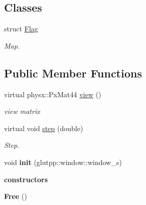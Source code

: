 \subsection*{\-Classes}
\begin{DoxyCompactItemize}
\item 
struct \hyperlink{structglutpp_1_1Camera_1_1View_1_1Free_1_1Flag}{\-Flag}
\begin{DoxyCompactList}\small\item\em \-Map. \end{DoxyCompactList}\end{DoxyCompactItemize}
\subsection*{\-Public \-Member \-Functions}
\begin{DoxyCompactItemize}
\item 
\hypertarget{classglutpp_1_1Camera_1_1View_1_1Free_a5f1648d4c0ad2289dd9e78f0b68b8a6c}{virtual physx\-::\-Px\-Mat44 \hyperlink{classglutpp_1_1Camera_1_1View_1_1Free_a5f1648d4c0ad2289dd9e78f0b68b8a6c}{view} ()}\label{classglutpp_1_1Camera_1_1View_1_1Free_a5f1648d4c0ad2289dd9e78f0b68b8a6c}

\begin{DoxyCompactList}\small\item\em view matrix \end{DoxyCompactList}\item 
virtual void \hyperlink{classglutpp_1_1Camera_1_1View_1_1Free_a2a117540633d55517305fa69cee5f336}{step} (double)
\begin{DoxyCompactList}\small\item\em \-Step. \end{DoxyCompactList}\item 
\hypertarget{classglutpp_1_1Camera_1_1View_1_1Free_a393fcaeafad6d09a4a6ec28800ac9706}{void {\bfseries init} (glutpp\-::window\-::window\-\_\-s)}\label{classglutpp_1_1Camera_1_1View_1_1Free_a393fcaeafad6d09a4a6ec28800ac9706}

\end{DoxyCompactItemize}
\begin{Indent}{\bf constructors}\par
\begin{DoxyCompactItemize}
\item 
\hypertarget{classglutpp_1_1Camera_1_1View_1_1Free_a3038c31e5a7a43d6dbf2d286e24d91c9}{{\bfseries \-Free} ()}\label{classglutpp_1_1Camera_1_1View_1_1Free_a3038c31e5a7a43d6dbf2d286e24d91c9}

\end{DoxyCompactItemize}
\end{Indent}
